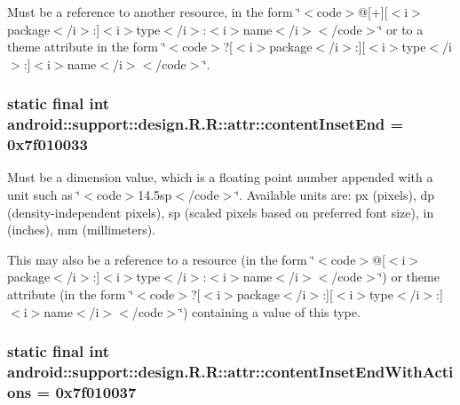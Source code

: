Must be a reference to another resource, in the form \char`\"{}$<$code$>$@\mbox{[}+\mbox{]}\mbox{[}$<$i$>$package$<$/i$>$:\mbox{]}$<$i$>$type$<$/i$>$:$<$i$>$name$<$/i$>$$<$/code$>$\char`\"{} or to a theme attribute in the form \char`\"{}$<$code$>$?\mbox{[}$<$i$>$package$<$/i$>$:\mbox{]}\mbox{[}$<$i$>$type$<$/i$>$:\mbox{]}$<$i$>$name$<$/i$>$$<$/code$>$\char`\"{}. \hypertarget{classandroid_1_1support_1_1design_1_1_r_1_1attr_5822bce6f41ea14888a26bade36b077f}{
\subsubsection[{contentInsetEnd}]{\setlength{\rightskip}{0pt plus 5cm}static final int android::support::design.R.R::attr::contentInsetEnd = 0x7f010033}}
\label{classandroid_1_1support_1_1design_1_1_r_1_1attr_5822bce6f41ea14888a26bade36b077f}


Must be a dimension value, which is a floating point number appended with a unit such as \char`\"{}$<$code$>$14.5sp$<$/code$>$\char`\"{}. Available units are: px (pixels), dp (density-independent pixels), sp (scaled pixels based on preferred font size), in (inches), mm (millimeters). 

This may also be a reference to a resource (in the form \char`\"{}$<$code$>$@\mbox{[}$<$i$>$package$<$/i$>$:\mbox{]}$<$i$>$type$<$/i$>$:$<$i$>$name$<$/i$>$$<$/code$>$\char`\"{}) or theme attribute (in the form \char`\"{}$<$code$>$?\mbox{[}$<$i$>$package$<$/i$>$:\mbox{]}\mbox{[}$<$i$>$type$<$/i$>$:\mbox{]}$<$i$>$name$<$/i$>$$<$/code$>$\char`\"{}) containing a value of this type. \hypertarget{classandroid_1_1support_1_1design_1_1_r_1_1attr_c7feafa022d4d198bbf49a26fea5edcc}{
\subsubsection[{contentInsetEndWithActions}]{\setlength{\rightskip}{0pt plus 5cm}static final int android::support::design.R.R::attr::contentInsetEndWithActions = 0x7f010037}}
\label{classandroid_1_1support_1_1design_1_1_r_1_1attr_c7feafa022d4d198bbf49a26fea5edcc}


